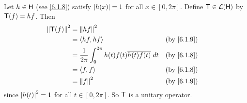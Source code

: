 \begin{eg}\label{6.5.2}
	Let \(h \in \mathsf{H}\) (see \cref{6.1.8}) satisfy \(\left\lvert h(x)\right\rvert = 1\) for all \(x \in [0, 2 \pi]\).
	Define \(\mathsf{T} \in \mathcal{L}(\mathsf{H})\) by \(\mathsf{T}(f) = hf\).
	Then
	\begin{align*}
		\norm{\T(f)}^2 & = \norm{hf}^2                                                                     \\
		               & = \inn{hf, hf}                                                    &  & \by{6.1.9} \\
		               & = \frac{1}{2 \pi} \int_0^{2 \pi} h(t) f(t) \conj{h(t) f(t)} \; dt &  & \by{6.1.8} \\
		               & = \inn{f, f}                                                      &  & \by{6.1.8} \\
		               & = \norm{f}^2                                                      &  & \by{6.1.9}
	\end{align*}
	since \(\left\lvert h(t)\right\rvert^2 = 1\) for all \(t \in [0, 2 \pi]\).
	So \(\mathsf{T}\) is a unitary operator.
\end{eg}
